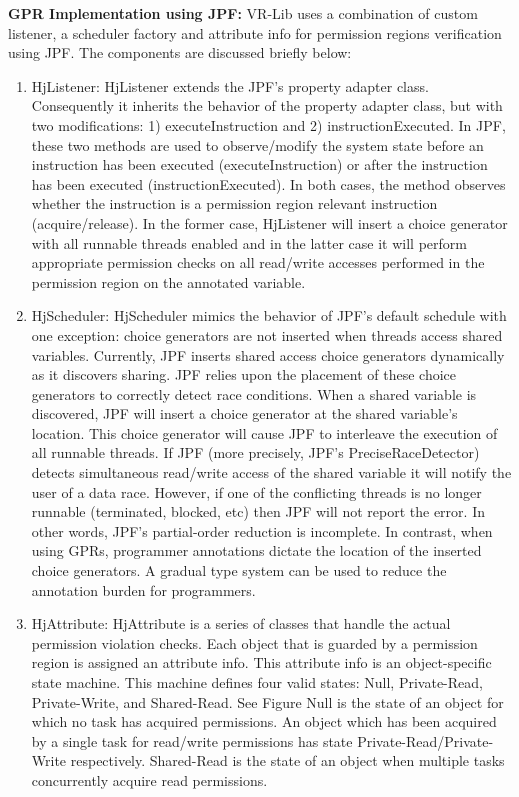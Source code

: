 \textbf{GPR Implementation using JPF:} VR-Lib uses a combination of custom
listener, a scheduler factory and attribute info for permission regions
verification using JPF. The components are discussed briefly below:
\begin{enumerate} 
\item HjListener: HjListener extends the JPF's property
adapter class. Consequently it inherits the behavior of the property adapter
class, but with two modifications: 1) executeInstruction and 2)
instructionExecuted. In JPF, these two methods are used to observe/modify the
system state before an instruction has been executed (executeInstruction) or
after the instruction has been executed (instructionExecuted). In both cases,
the method observes whether the instruction is a permission region relevant
instruction (acquire/release). In the former case, HjListener will insert a
choice generator with all runnable threads enabled and in the latter case it
will perform appropriate permission checks on all read/write accesses performed
in the permission region on the annotated variable.
\item HjScheduler: HjScheduler mimics the behavior of JPF's default schedule
with one exception: choice generators are not inserted when threads access
shared variables. Currently, JPF inserts shared access choice generators
dynamically as it discovers sharing. JPF relies upon the placement of these
choice generators to correctly detect race conditions. When a shared variable is
discovered, JPF will insert a choice generator at the shared variable's
location. This choice generator will cause JPF to interleave the execution of
all runnable threads. If JPF (more precisely, JPF's PreciseRaceDetector) detects
simultaneous read/write access of the shared variable it will notify the user of
a data race. However, if one of the conflicting threads is no longer runnable
(terminated, blocked, etc) then JPF will not report the error. In other words,
JPF's partial-order reduction is incomplete. In contrast, when using GPRs,
programmer annotations dictate the location of the inserted choice generators. A
gradual type system can be used to reduce the annotation burden for programmers.
\item HjAttribute: HjAttribute is a series of classes that handle the actual
permission violation checks. Each object that is guarded by a permission region
is assigned an attribute info. This attribute info is an object-specific state
machine. This machine defines four valid states: Null, Private-Read,
Private-Write, and Shared-Read. See Figure{} Null is the state of an object for
which no task has acquired permissions. An object which has been acquired by a
single task for read/write permissions has state Private-Read/Private-Write
respectively. Shared-Read is the state of an object when multiple tasks
concurrently acquire read permissions.
\end{enumerate}
